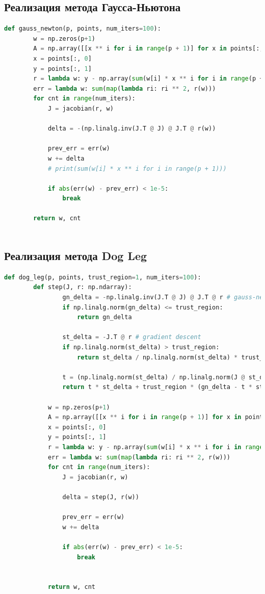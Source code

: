 \documentclass[a4paper,14pt,oneside,openany]{memoir}
\begin{document}
\subsection{Реализация метода Гаусса-Ньютона}
\begin{lstlisting}[language=Python, caption=Метод Гаусса-Ньютона]
	def gauss_newton(p, points, num_iters=100):
	    w = np.zeros(p+1)
	    A = np.array([[x ** i for i in range(p + 1)] for x in points[:, 0]])
	    x = points[:, 0]
	    y = points[:, 1]
	    r = lambda w: y - np.array(sum(w[i] * x ** i for i in range(p + 1)))
	    err = lambda w: sum(map(lambda ri: ri ** 2, r(w)))
	    for cnt in range(num_iters):
	        J = jacobian(r, w)
	
	        delta = -(np.linalg.inv(J.T @ J) @ J.T @ r(w))
	        
	        prev_err = err(w)
	        w += delta 
	        # print(sum(w[i] * x ** i for i in range(p + 1)))
	
	        if abs(err(w) - prev_err) < 1e-5:
	            break
	
	    return w, cnt
	
\end{lstlisting}

\newpage

\subsection{Реализация метода Dog Leg}
\begin{lstlisting}[language=Python, caption=Метод Powell's Dog Leg]
	def dog_leg(p, points, trust_region=1, num_iters=100):
		def step(J, r: np.ndarray):
		        gn_delta = -np.linalg.inv(J.T @ J) @ J.T @ r # gauss-newton
		        if np.linalg.norm(gn_delta) <= trust_region:
		            return gn_delta
		        
		        st_delta = -J.T @ r # gradient descent
		        if np.linalg.norm(st_delta) > trust_region:
		            return st_delta / np.linalg.norm(st_delta) * trust_region
		
		        t = (np.linalg.norm(st_delta) / np.linalg.norm(J @ st_delta)) ** 2
		        return t * st_delta + trust_region * (gn_delta - t * st_delta)
		
		    w = np.zeros(p+1)
		    A = np.array([[x ** i for i in range(p + 1)] for x in points[:, 0]])
		    x = points[:, 0]
		    y = points[:, 1]
		    r = lambda w: y - np.array(sum(w[i] * x ** i for i in range(p + 1)))
		    err = lambda w: sum(map(lambda ri: ri ** 2, r(w)))
		    for cnt in range(num_iters):
		        J = jacobian(r, w)
		
		        delta = step(J, r(w))
		
		        prev_err = err(w)
		        w += delta 
		
		        if abs(err(w) - prev_err) < 1e-5:
		            break
		
		
		    return w, cnt
	
\end{lstlisting}
\end{document}
